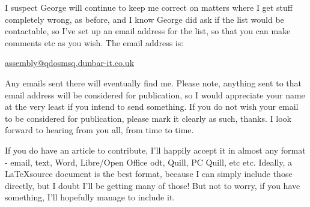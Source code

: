 I suspect George will continue to keep me correct on matters where I get stuff completely wrong, as before, and I know George did ask if the list would be contactable, so I've set up an email address for the list, so that you can make comments etc as you wish. The email address is:

\url{assembly@qdosmsq.dunbar-it.co.uk}

Any emails sent there will eventually find me. Please note, anything sent to that email address will be considered for publication, so I would appreciate your name at the very least if you intend to send something. If you do not wish your email to be considered for publication, please mark it clearly as such, thanks. I look forward to hearing from you all, from time to time.

If you do have an article to contribute, I'll happily accept it in almost any format - email, text, Word, Libre/Open Office odt, Quill, PC Quill, etc etc. Ideally, a \LaTeX source document is the best format, because I
can simply include those directly, but I doubt I'll be getting many of those! But not to worry, if you have something, I'll hopefully manage to include it.
